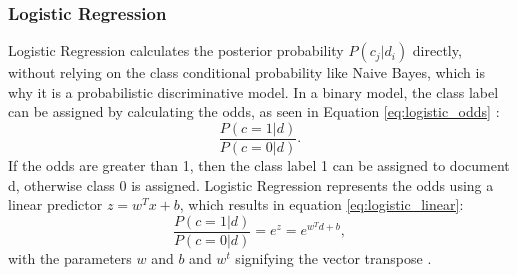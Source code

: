 \subsubsection{Logistic Regression}
Logistic Regression calculates the posterior probability $P(c_j|d_i)$ directly, without relying on the class conditional probability like Naive Bayes, which is why it is a probabilistic discriminative model. In a binary model, the class label can be assigned by calculating the odds, as seen in Equation \eqref{eq:logistic_odds} \cite{DBLP:books/aw/TanSKK2019}:
        \begin{equation}
            \label{eq:logistic_odds}
                \frac{P(c=1|d)}{P(c=0|d)}.
        \end{equation}
If the odds are greater than 1, then the class label 1 can be assigned to document d, otherwise class 0 is assigned. Logistic Regression represents the odds using a linear predictor $z=w^Tx + b$, which results in equation \eqref{eq:logistic_linear}:
        \begin{equation}
            \label{eq:logistic_linear}
                \frac{P(c=1|d)}{P(c=0|d)} = e^z = e^{w^Td+b},
        \end{equation}
with the parameters $w$ and $b$ and $w^t$ signifying the vector transpose \cite{DBLP:books/aw/TanSKK2019}.

